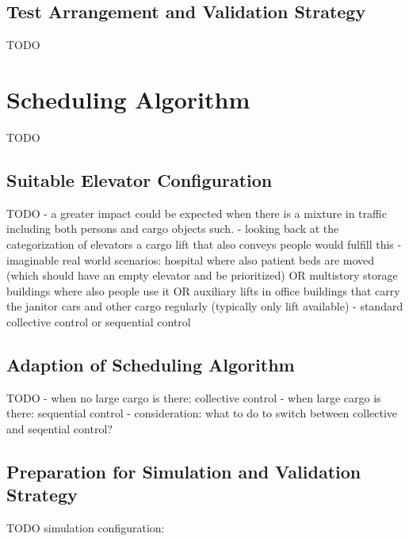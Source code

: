 \subsection{Test Arrangement and Validation Strategy}
TODO

\section{Scheduling Algorithm}
TODO
\subsection{Suitable Elevator Configuration}
TODO
- a greater impact could be expected when there is a mixture in traffic including both persons and cargo objects such. 
- looking back at the categorization of elevators a cargo lift that also conveys people would fulfill this
- imaginable real world scenarios: hospital where also patient beds are moved (which should have an empty elevator and be prioritized) OR multistory storage buildings where also people use it OR auxiliary lifts in office buildings that carry the janitor cars and other cargo regularly (typically only lift available)
- standard collective control or sequential control
\subsection{Adaption of Scheduling Algorithm}
TODO
- when no large cargo is there: collective control
- when large cargo is there: sequential control
- consideration: what to do to switch between collective and seqential control?
\subsection{Preparation for Simulation and Validation Strategy}

TODO simulation configuration:
\autocite[][p.~347]{barney2016handbook}

